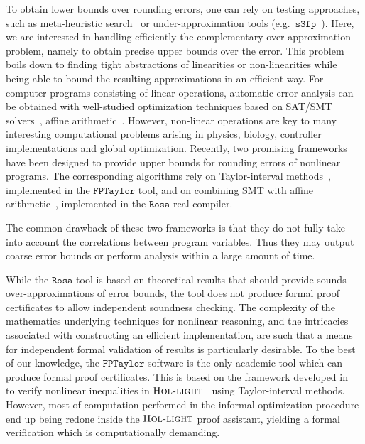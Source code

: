 \documentclass[preprint]{sigplanconf}
\newcommand{\sthreefp}{\mathtt{s3fp}}
\newcommand{\hol}{\text{\sc Hol-light}}
\newcommand{\rosa}{\mathtt{Rosa}}
\newcommand{\fptaylor}{\mathtt{FPTaylor}}
\theoremstyle{plain}
\begin{document}
To obtain lower bounds over rounding errors, one can rely on testing approaches, such as meta-heuristic search~\cite{Borges12Test} or under-approximation tools (e.g.~$\sthreefp$~\cite{Chiang14s3fp}). Here, we are interested in handling efficiently the complementary over-approximation problem, namely to obtain precise upper bounds over the error. This problem boils down to finding tight abstractions of linearities or non-linearities while being able to bound the resulting approximations in an efficient way.  
%
For computer programs consisting of linear operations, automatic error analysis can be obtained with well-studied optimization techniques based on SAT/SMT solvers~\cite{hgbk2012fmcad}, affine arithmetic~\cite{fluctuat}. However, non-linear operations are key to many interesting computational problems arising in physics, biology, controller implementations and global optimization. 
Recently, two promising frameworks have been designed to provide upper bounds for rounding errors of nonlinear programs. The corresponding algorithms rely on Taylor-interval methods~\cite{fptaylor15}, implemented in the $\fptaylor$ tool, and on combining SMT with affine arithmetic~\cite{Darulova14Popl}, implemented in the $\rosa$ real compiler.

The common drawback of these two frameworks is that they do not fully take into account the correlations between program variables. Thus they may output coarse error bounds or perform analysis within a large amount of time.  

While the $\rosa$ tool is based on theoretical results that should provide sounds over-approximations of error bounds, the tool does not produce formal proof certificates to allow independent soundness checking.  The complexity of the mathematics underlying techniques for nonlinear reasoning, and the intricacies associated with constructing an efficient implementation, are such that a means for independent formal validation of results is particularly desirable.  
To the best of our knowledge, the $\fptaylor$ software is the only academic tool which can produce formal proof certificates. This is based on the framework developed in~\cite{SolovyevH13} to verify nonlinear inequalities in $\hol$~\cite{hollight} using Taylor-interval methods. However, most of computation performed in the informal optimization procedure end up being redone inside the $\hol$ proof assistant, yielding a formal verification which is computationally demanding.
\end{document}
